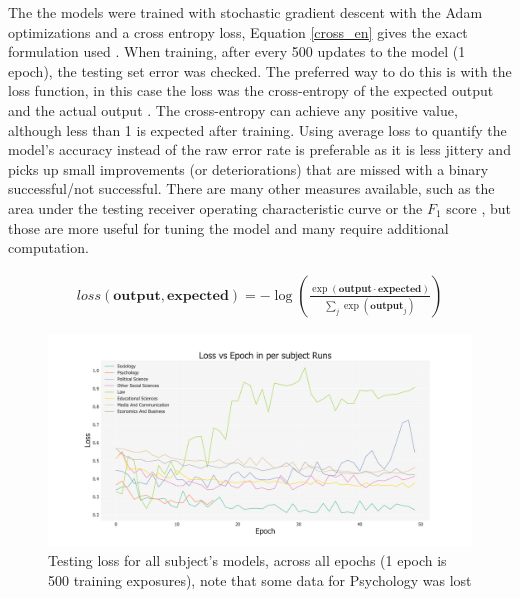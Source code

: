 \documentclass[12pt, a4paper]{article}
\begin{document}
The the models were trained with stochastic gradient descent with the Adam optimizations \citep{collins2012advertiser} and a cross entropy loss, Equation \ref{cross_en} gives the exact formulation used \citep{pytorch}. When training, after every 500 updates to the model (1 epoch), the testing set error was checked. The preferred way to do this is with the loss function, in this case the loss \citep{deeploss} was the cross-entropy of the expected output and the actual output . The cross-entropy  can achieve any positive value, although less than 1 is expected after training. Using average loss to quantify the model's accuracy instead of the raw error rate is preferable as it is less jittery \citep{deeploss} and picks up small improvements (or deteriorations) that are missed with a binary successful/not successful. There are many other measures available, such as the area under the testing receiver operating characteristic curve or the $F_1$ score \citep{james2013introduction}, but those are more useful for tuning the model and many require additional computation.

\begin{align}\label{cross_en}
	loss(\boldsymbol{output}, \boldsymbol{expected}) = - \log \left(\frac{\exp(\boldsymbol{output} \cdot \boldsymbol{expected})}{\sum_j \exp (\boldsymbol{output}_j)}\right)
\end{align}

\begin{figure}[ht]
	\centering
	\begin{adjustbox}{center}
		\includegraphics[width=1.3\textwidth]{loss_mixed}
	\end{adjustbox}
	\caption{Testing loss for all subject's models, across all epochs (1 epoch is 500 training exposures), note that some data for Psychology was lost}\label{loss}
\end{figure}
\end{document}
